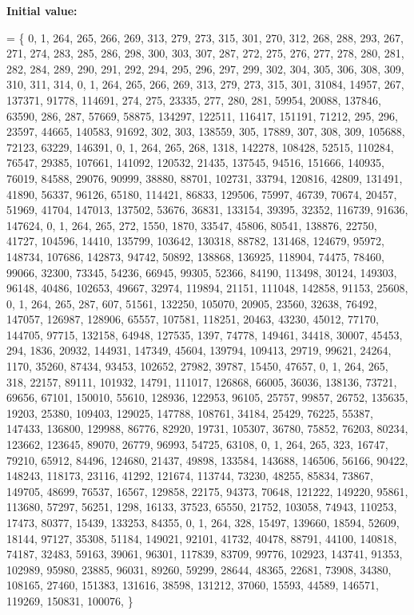{\bfseries Initial value\+:}
\begin{DoxyCode}
= \{
    0, 1, 264, 265, 266, 269, 313, 279, 273, 315, 301, 270, 312, 268, 288, 293, 267, 271, 274, 283, 285, 
      286, 298, 300, 303, 307, 287, 272, 275, 276, 277, 278, 280, 281, 282, 284, 289, 290, 291, 292, 294, 295, 296, 
      297, 299, 302, 304, 305, 306, 308, 309, 310, 311, 314, 
    0, 1, 264, 265, 266, 269, 313, 279, 273, 315, 301, 31084, 14957, 267, 137371, 91778, 114691, 274, 275, 
      23335, 277, 280, 281, 59954, 20088, 137846, 63590, 286, 287, 57669, 58875, 134297, 122511, 116417, 151191, 
      71212, 295, 296, 23597, 44665, 140583, 91692, 302, 303, 138559, 305, 17889, 307, 308, 309, 105688, 72123, 
      63229, 146391, 
    0, 1, 264, 265, 268, 1318, 142278, 108428, 52515, 110284, 76547, 29385, 107661, 141092, 120532, 21435, 
      137545, 94516, 151666, 140935, 76019, 84588, 29076, 90999, 38880, 88701, 102731, 33794, 120816, 42809, 
      131491, 41890, 56337, 96126, 65180, 114421, 86833, 129506, 75997, 46739, 70674, 20457, 51969, 41704, 147013, 
      137502, 53676, 36831, 133154, 39395, 32352, 116739, 91636, 147624, 
    0, 1, 264, 265, 272, 1550, 1870, 33547, 45806, 80541, 138876, 22750, 41727, 104596, 14410, 135799, 
      103642, 130318, 88782, 131468, 124679, 95972, 148734, 107686, 142873, 94742, 50892, 138868, 136925, 118904, 
      74475, 78460, 99066, 32300, 73345, 54236, 66945, 99305, 52366, 84190, 113498, 30124, 149303, 96148, 40486, 
      102653, 49667, 32974, 119894, 21151, 111048, 142858, 91153, 25608, 
    0, 1, 264, 265, 287, 607, 51561, 132250, 105070, 20905, 23560, 32638, 76492, 147057, 126987, 128906, 
      65557, 107581, 118251, 20463, 43230, 45012, 77170, 144705, 97715, 132158, 64948, 127535, 1397, 74778, 149461, 
      34418, 30007, 45453, 294, 1836, 20932, 144931, 147349, 45604, 139794, 109413, 29719, 99621, 24264, 1170, 
      35260, 87434, 93453, 102652, 27982, 39787, 15450, 47657, 
    0, 1, 264, 265, 318, 22157, 89111, 101932, 14791, 111017, 126868, 66005, 36036, 138136, 73721, 69656, 
      67101, 150010, 55610, 128936, 122953, 96105, 25757, 99857, 26752, 135635, 19203, 25380, 109403, 129025, 
      147788, 108761, 34184, 25429, 76225, 55387, 147433, 136800, 129988, 86776, 82920, 19731, 105307, 36780, 75852, 
      76203, 80234, 123662, 123645, 89070, 26779, 96993, 54725, 63108, 
    0, 1, 264, 265, 323, 16747, 79210, 65912, 84496, 124680, 21437, 49898, 133584, 143688, 146506, 56166, 
      90422, 148243, 118173, 23116, 41292, 121674, 113744, 73230, 48255, 85834, 73867, 149705, 48699, 76537, 16567,
       129858, 22175, 94373, 70648, 121222, 149220, 95861, 113680, 57297, 56251, 1298, 16133, 37523, 65550, 21752,
       103058, 74943, 110253, 17473, 80377, 15439, 133253, 84355, 
    0, 1, 264, 328, 15497, 139660, 18594, 52609, 18144, 97127, 35308, 51184, 149021, 92101, 41732, 40478, 
      88791, 44100, 140818, 74187, 32483, 59163, 39061, 96301, 117839, 83709, 99776, 102923, 143741, 91353, 102989,
       95980, 23885, 96031, 89260, 59299, 28644, 48365, 22681, 73908, 34380, 108165, 27460, 151383, 131616, 38598,
       131212, 37060, 15593, 44589, 146571, 119269, 150831, 100076, 
\}
\end{DoxyCode}
